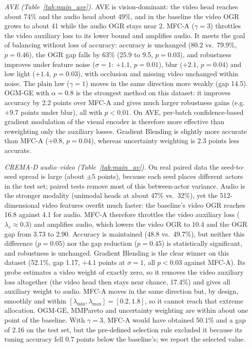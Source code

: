 \documentclass[fleqn,10pt]{wlscirep}
\begin{document}
\emph{AVE (Table~\ref{tab:main_ave}).} AVE is vision-dominant: the video head reaches about 74\% and the audio head about 49\%, and in the baseline the video OGR grows to about 41 while the audio OGR stays near 2. MFC-A ($\gamma{=}3$) throttles the video auxiliary loss to its lower bound and amplifies audio. It meets the goal of balancing without loss of accuracy: accuracy is unchanged (80.2 vs.\ 79.9\%, $p{=}0.46$), the OGR gap falls by 63\% (25.9 to 9.5, $p{=}0.03$), and robustness improves under feature noise ($\sigma{=}1$: $+1.1$, $p{=}0.01$), blur ($+2.1$, $p{=}0.04$) and low light ($+1.4$, $p{=}0.03$), with occlusion and missing video unchanged within noise. The plain law ($\gamma{=}1$) moves in the same direction more weakly (gap 14.5). OGM-GE with $\alpha{=}0.8$ is the strongest method on this dataset: it improves accuracy by 2.2 points over MFC-A and gives much larger robustness gains (e.g.\ $+9.7$ points under blur), all with $p<0.01$. On AVE, per-batch confidence-based gradient modulation of the visual encoder is therefore more effective than reweighting only the auxiliary losses. Gradient Blending is slightly more accurate than MFC-A ($+0.8$, $p{=}0.04$), whereas uncertainty weighting is 2.3 points less accurate.

\emph{CREMA-D audio--video (Table~\ref{tab:main_av}).} On real paired data the seed-to-seed spread is large (about $\pm5$ points), because each seed places different actors in the test set; paired tests remove most of this between-actor variance. Audio is the stronger modality (unimodal heads at about 47\% vs.\ 32\%), yet the 512-dimensional video features overfit much faster: the baseline's video OGR reaches 16.8 against 4.1 for audio. MFC-A therefore throttles the video auxiliary loss ($\lambda_v\approx0.3$) and amplifies audio, which lowers the video OGR to 10.4 and the OGR gap from 3.73 to 2.90. Accuracy is maintained (48.8 vs.\ 49.7\%), but neither this difference ($p{=}0.05$) nor the gap reduction ($p{=}0.45$) is statistically significant, and robustness is unchanged. Gradient Blending is the clear winner on this dataset (52.1\%, gap 1.17, $+4.1$ points at $\sigma{=}1$, all $p<0.03$ against MFC-A). Its probe estimates a video weight of exactly zero, so it removes the video auxiliary loss altogether (the video head then stays near chance, 17.4\%) and gives all auxiliary weight to audio. MFC-A moves in the same direction but, by design, smoothly and within $[\lambda_{\min},\lambda_{\max}]=[0.2,1.8]$, so it cannot reach that extreme allocation. OGM-GE, MMPareto and uncertainty weighting are within about one point of the baseline. With $\gamma{=}3$, MFC-A would have obtained 50.1\% and a gap of 2.16 on the test set, but the pre-defined selection rule excluded it because its tuning accuracy fell 0.7 points below the baseline's; we report the selected value.
\end{document}
